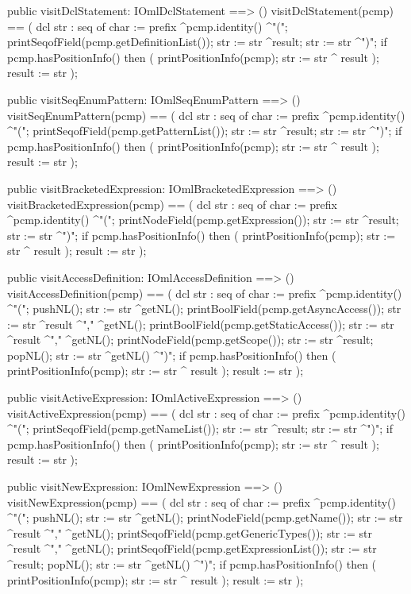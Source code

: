 \begin{vdm_al}
  public visitDclStatement: IOmlDclStatement ==> ()
  visitDclStatement(pcmp) ==
    ( dcl str : seq of char := prefix ^pcmp.identity() ^"(";
      printSeqofField(pcmp.getDefinitionList());
      str := str ^result;
      str := str ^")";
      if pcmp.hasPositionInfo()
      then ( printPositionInfo(pcmp);
             str := str ^ result );
      result := str );

  public visitSeqEnumPattern: IOmlSeqEnumPattern ==> ()
  visitSeqEnumPattern(pcmp) ==
    ( dcl str : seq of char := prefix ^pcmp.identity() ^"(";
      printSeqofField(pcmp.getPatternList());
      str := str ^result;
      str := str ^")";
      if pcmp.hasPositionInfo()
      then ( printPositionInfo(pcmp);
             str := str ^ result );
      result := str );

  public visitBracketedExpression: IOmlBracketedExpression ==> ()
  visitBracketedExpression(pcmp) ==
    ( dcl str : seq of char := prefix ^pcmp.identity() ^"(";
      printNodeField(pcmp.getExpression());
      str := str ^result;
      str := str ^")";
      if pcmp.hasPositionInfo()
      then ( printPositionInfo(pcmp);
             str := str ^ result );
      result := str );

  public visitAccessDefinition: IOmlAccessDefinition ==> ()
  visitAccessDefinition(pcmp) ==
    ( dcl str : seq of char := prefix ^pcmp.identity() ^"(";
      pushNL();
      str := str ^getNL();
      printBoolField(pcmp.getAsyncAccess());
      str := str ^result ^"," ^getNL();
      printBoolField(pcmp.getStaticAccess());
      str := str ^result ^"," ^getNL();
      printNodeField(pcmp.getScope());
      str := str ^result;
      popNL();
      str := str ^getNL() ^")";
      if pcmp.hasPositionInfo()
      then ( printPositionInfo(pcmp);
             str := str ^ result );
      result := str );

  public visitActiveExpression: IOmlActiveExpression ==> ()
  visitActiveExpression(pcmp) ==
    ( dcl str : seq of char := prefix ^pcmp.identity() ^"(";
      printSeqofField(pcmp.getNameList());
      str := str ^result;
      str := str ^")";
      if pcmp.hasPositionInfo()
      then ( printPositionInfo(pcmp);
             str := str ^ result );
      result := str );

  public visitNewExpression: IOmlNewExpression ==> ()
  visitNewExpression(pcmp) ==
    ( dcl str : seq of char := prefix ^pcmp.identity() ^"(";
      pushNL();
      str := str ^getNL();
      printNodeField(pcmp.getName());
      str := str ^result ^"," ^getNL();
      printSeqofField(pcmp.getGenericTypes());
      str := str ^result ^"," ^getNL();
      printSeqofField(pcmp.getExpressionList());
      str := str ^result;
      popNL();
      str := str ^getNL() ^")";
      if pcmp.hasPositionInfo()
      then ( printPositionInfo(pcmp);
             str := str ^ result );
      result := str );


\end{vdm_al}
